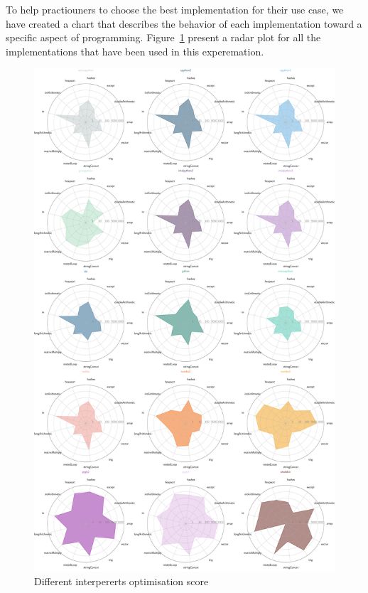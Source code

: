 To help practiouners to choose the best implementation for their use case, we have created a chart that describes the behavior of each implementation toward a specific aspect of programming. 
Figure~\ref{fig:tommi_all} present a radar plot for all the implementations that have been used in this experemation.
\begin{figure}[!htb]
      \centering
      \includegraphics[width=\linewidth]{imgs/alltomti_performance}
      \caption{Different interpererts optimisation score }
      \label{fig:tommi_all}
\end{figure}
  
